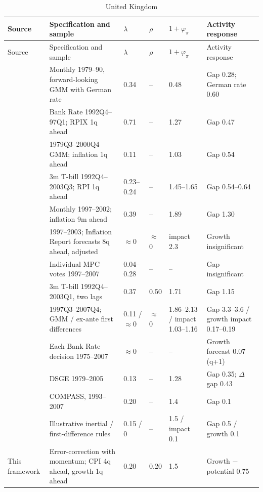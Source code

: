 \documentclass[11pt,a4paper]{article}
\begin{document}
\begin{footnotesize}
\begin{longtable}{@{}L{28mm}L{44mm}L{12mm}L{8mm}L{18mm}L{28mm}@{}}
\caption{United Kingdom}\\
\toprule
Source & Specification and sample & $\lambda$ & $\rho$ & $1+\varphi_\pi$ & Activity response \\
\midrule
\endfirsthead
\toprule
Source & Specification and sample & $\lambda$ & $\rho$ & $1+\varphi_\pi$ & Activity response \\
\midrule
\endhead
\bottomrule
\endfoot
\textcite{cgg1998} & Monthly 1979--90, forward-looking GMM with German rate & 0.34 & -- & 0.48 & Gap 0.28; German rate 0.60 \\
\textcite{nelson2000} & Bank Rate 1992Q4--97Q1; RPIX 1q ahead & 0.71 & -- & 1.27 & Gap 0.47 \\
\textcite{chadha2004} & 1979Q3--2000Q4 GMM; inflation 1q ahead & 0.11 & -- & 1.03 & Gap 0.54 \\
\textcite{martinmilas2004} & 3m T-bill 1992Q4--2003Q3; RPI 1q ahead & 0.23--0.24 & -- & 1.45--1.65 & Gap 0.54--0.64 \\
\textcite{adam2005} & Monthly 1997--2002; inflation 9m ahead & 0.39 & -- & 1.89 & Gap 1.30 \\
\textcite{goodhart2005} & 1997--2003; Inflation Report forecasts 8q ahead, adjusted & $\approx$0 & $\approx$0 & impact 2.3 & Growth insignificant \\
\textcite{besley2008} & Individual MPC votes 1997--2007 & 0.04--0.28 & -- & -- & Gap insignificant \\
\textcite{boinetmartin2008} & 3m T-bill 1992Q4--2003Q1, two lags & 0.37 & 0.50 & 1.71 & Gap 1.15 \\
\textcite{cobhamkang2013} & 1997Q3--2007Q4; GMM / ex-ante first differences & 0.11 / $\approx$0 & $\approx$0 & 1.86--2.13 / impact 1.03--1.16 & Gap 3.3--3.6 / growth impact 0.17--0.19 \\
\textcite{cloyne2016} & Each Bank Rate decision 1975--2007 & $\approx$0 & -- & -- & Growth forecast 0.07 (q+1) \\
\textcite{dicecio2007} & DSGE 1979--2005 & 0.13 & -- & 1.28 & Gap 0.35; $\Delta$gap 0.43 \\
\textcite{burgess2013} & COMPASS, 1993--2007 & 0.20 & -- & 1.4 & Gap 0.1 \\
\textcite{boe2025mpr} & Illustrative inertial / first-difference rules & 0.15 / 0 & -- & 1.5 / impact 0.1 & Gap 0.5 / growth 0.1 \\
This framework & Error-correction with momentum; CPI 4q ahead, growth 1q ahead & 0.20 & 0.20 & 1.5 & Growth $-$ potential 0.75 \\
\end{longtable}


\end{footnotesize}
\end{document}
